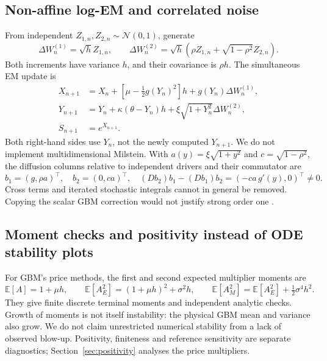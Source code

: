 \documentclass[11pt,a4paper]{article}
\begin{document}
\subsection{Non-affine log-EM and correlated noise}
From independent $Z_{1,n},Z_{2,n}\sim\mathcal N(0,1)$, generate
\begin{equation}\label{eq:correlation}
\Delta W_n^{(1)}=\sqrt h Z_{1,n},\qquad
\Delta W_n^{(2)}=\sqrt h(\rho Z_{1,n}+\sqrt{1-\rho^2}Z_{2,n}).
\end{equation}
Both increments have variance $h$, and their covariance is $\rho h$. The simultaneous EM update is
\begin{align}
X_{n+1}&=X_n+[\mu-\tfrac12g(Y_n)^2]h+g(Y_n)\Delta W_n^{(1)},\label{eq:na-em-x}\\
Y_{n+1}&=Y_n+\kappa(\theta-Y_n)h+\xi\sqrt{1+Y_n^2}\Delta W_n^{(2)},\label{eq:na-em-y}\\
S_{n+1}&=e^{X_{n+1}}.\label{eq:na-price}
\end{align}
Both right-hand sides use $Y_n$, not the newly computed $Y_{n+1}$. We do not implement multidimensional Milstein. With $a(y)=\xi\sqrt{1+y^2}$ and $c=\sqrt{1-\rho^2}$, the diffusion columns relative to independent drivers and their commutator are
\begin{equation}\label{eq:commutator}
b_1=(g,\rho a)^\top,\quad b_2=(0,ca)^\top,\quad
(Db_2)b_1-(Db_1)b_2=(-ca\,g'(y),0)^\top\ne0.
\end{equation}
Cross terms and iterated stochastic integrals cannot in general be removed. Copying the scalar GBM correction would not justify strong order one \cite{kloeden}.

\subsection{Moment checks and positivity instead of ODE stability plots}
For GBM's price methods, the first and second expected multiplier moments are
\begin{equation}\label{eq:discrete-second}
\mathbb E[A]=1+\mu h,\qquad
\mathbb E[A_E^2]=(1+\mu h)^2+\sigma^2h,\qquad
\mathbb E[A_M^2]=\mathbb E[A_E^2]+\tfrac12\sigma^4h^2.
\end{equation}
They give finite discrete terminal moments and independent analytic checks. Growth of moments is not itself instability: the physical GBM mean and variance also grow. We do not claim unrestricted numerical stability from a lack of observed blow-up. Positivity, finiteness and reference sensitivity are separate diagnostics; Section~\ref{sec:positivity} analyses the price multipliers.
\newpage
\end{document}
